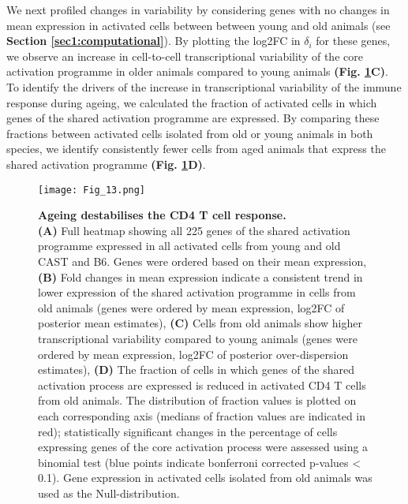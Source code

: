 We next profiled changes in variability by considering genes with no changes in mean expression in activated cells between between young and old animals (see \textbf{Section \ref{sec1:computational}}). By plotting the log2FC in $\delta_i$ for these genes, we observe an increase in cell-to-cell transcriptional variability of the core activation programme in older animals compared to young animals \textbf{(Fig. \ref{fig1:variability_ageing}C)}. To identify the drivers of the increase in transcriptional variability of the immune response during ageing, we calculated the fraction of activated cells in which genes of the shared activation programme are expressed. By comparing these fractions between activated cells isolated from old or young animals in both species, we identify consistently fewer cells from aged animals that express the shared activation programme \textbf{(Fig. \ref{fig1:variability_ageing}D)}. \\

\newpage

\begin{figure}[!ht]
\centering
\texttt{[image: Fig\_13.png]}
\caption[Ageing destabilises the CD4\plus{} T cell response]{\textbf{Ageing destabilises the CD4\plus{} T cell response.} \\
\textbf{(A)} Full heatmap showing all 225 genes of the shared activation programme expressed in all activated cells from young and old CAST and B6. Genes were ordered based on their mean expression, \textbf{(B)} Fold changes in mean expression indicate a consistent trend in lower expression of the shared activation programme in cells from old animals (genes were ordered by mean expression, log2FC of posterior mean estimates), \textbf{(C)} Cells from old animals show higher transcriptional variability compared to young animals (genes were ordered by mean expression, log2FC of posterior over-dispersion estimates), \textbf{(D)} The fraction of cells in which genes of the shared activation process are expressed is reduced in activated CD4\plus{} T cells from old animals. The distribution of fraction values is plotted on each corresponding axis (medians of fraction values are indicated in red); statistically significant changes in the percentage of cells expressing genes of the core activation process were assessed using a binomial test (blue points indicate bonferroni corrected p-values < 0.1). Gene expression in activated cells isolated from old animals was used as the Null-distribution.}
\label{fig1:variability_ageing}
\end{figure}

